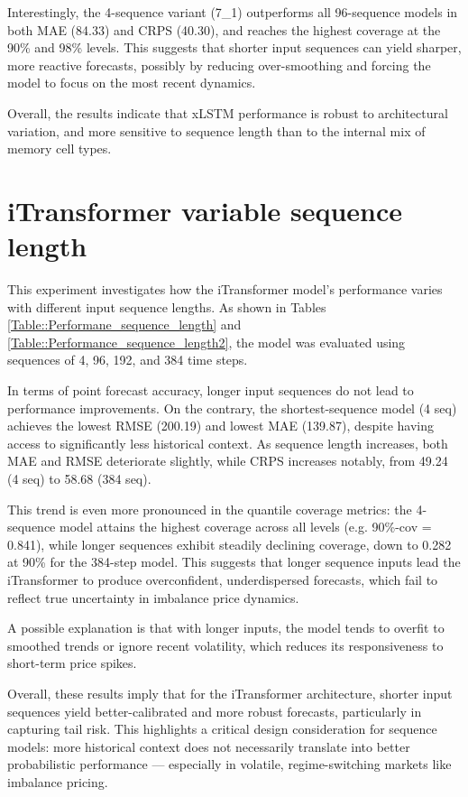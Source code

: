 \documentclass[class=scrbook, crop=false]{standalone}
\begin{document}
Interestingly, the 4-sequence variant (7\_1) outperforms all 96-sequence models in both MAE (84.33) and CRPS (40.30), and reaches the highest coverage at the 90\% and 98\% levels. This suggests that shorter input sequences can yield sharper, more reactive forecasts, possibly by reducing over-smoothing and forcing the model to focus on the most recent dynamics. 

Overall, the results indicate that xLSTM performance is robust to architectural variation, and more sensitive to sequence length than to the internal mix of memory cell types.


\section{iTransformer variable sequence length}
This experiment investigates how the iTransformer model’s performance varies with different input sequence lengths. As shown in Tables \ref{Table::Performane_sequence_length} and \ref{Table::Performance_sequence_length2}, the model was evaluated using sequences of 4, 96, 192, and 384 time steps.

In terms of point forecast accuracy, longer input sequences do not lead to performance improvements. On the contrary, the shortest-sequence model (4 seq) achieves the lowest RMSE (200.19) and lowest MAE (139.87), despite having access to significantly less historical context. As sequence length increases, both MAE and RMSE deteriorate slightly, while CRPS increases notably, from 49.24 (4 seq) to 58.68 (384 seq).

This trend is even more pronounced in the quantile coverage metrics: the 4-sequence model attains the highest coverage across all levels (e.g. 90\%-cov = 0.841), while longer sequences exhibit steadily declining coverage, down to 0.282 at 90\% for the 384-step model. This suggests that longer sequence inputs lead the iTransformer to produce overconfident, underdispersed forecasts, which fail to reflect true uncertainty in imbalance price dynamics.

A possible explanation is that with longer inputs, the model tends to overfit to smoothed trends or ignore recent volatility, which reduces its responsiveness to short-term price spikes. 

Overall, these results imply that for the iTransformer architecture, shorter input sequences yield better-calibrated and more robust forecasts, particularly in capturing tail risk. This highlights a critical design consideration for sequence models: more historical context does not necessarily translate into better probabilistic performance — especially in volatile, regime-switching markets like imbalance pricing.
\end{document}
